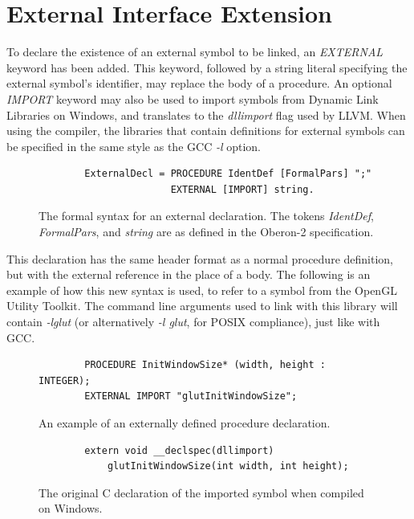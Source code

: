 \documentclass[a4paper,11pt]{article}
\begin{document}
    \section{External Interface Extension}
    To declare the existence of an external symbol to be linked, an \emph{EXTERNAL} keyword has been added. This keyword, followed by a string literal specifying the external symbol's identifier, may replace the body of a procedure. An optional \emph{IMPORT} keyword may also be used to import symbols from Dynamic Link Libraries on Windows, and translates to the \emph{dllimport} flag used by LLVM. When using the compiler, the libraries that contain definitions for external symbols can be specified in the same style as the GCC \emph{-l} option.

    \begin{figure}[!htbp]
    \begin{lstlisting}
        ExternalDecl = PROCEDURE IdentDef [FormalPars] ";"
                       EXTERNAL [IMPORT] string.
    \end{lstlisting}
    \caption{The formal syntax for an external declaration. The tokens \emph{IdentDef}, \emph{FormalPars}, and \emph{string} are as defined in the Oberon-2 specification\cite{oberspec}.}
    \end{figure}

    \noindent
    This declaration has the same header format as a normal procedure definition, but with the external reference in the place of a body. The following is an example of how this new syntax is used, to refer to a symbol from the OpenGL Utility Toolkit\cite{glut}. The command line arguments used to link with this library will contain \emph{-lglut} (or alternatively \emph{-l glut}, for POSIX compliance), just like with GCC.

    \begin{figure}[!htbp]
    \begin{lstlisting}
        PROCEDURE InitWindowSize* (width, height : INTEGER);
        EXTERNAL IMPORT "glutInitWindowSize";
    \end{lstlisting}
    \caption{An example of an externally defined procedure declaration.}
    \end{figure}

    \begin{figure}[!htbp]
    \begin{lstlisting}
        extern void __declspec(dllimport)
            glutInitWindowSize(int width, int height);
    \end{lstlisting}
    \caption{The original C declaration of the imported symbol\cite{gluth} when compiled on Windows.}
    \end{figure}
\end{document}
